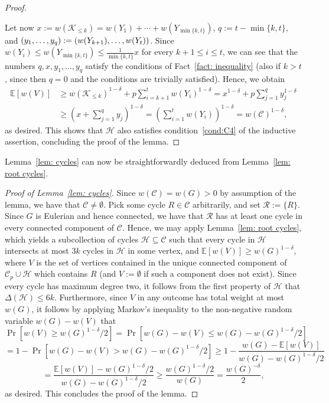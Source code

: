 \documentclass[11pt,reqno]{article}
\newenvironment{claimproof}[1][\proofname]{\proof[#1]\renewcommand{\qedsymbol}{$\blacksquare$}}{\endproof}
\begin{document}
\begin{proof}
\begin{claimproof}
\textcolor{white}{hack}
\end{claimproof}

Let now $x:=w(\mathcal{K}_{\le k})=w(Y_1)+\cdots+w(Y_{\min\{k,t\}})$, $q:=t-\min\{k,t\}$, and $(y_1,\ldots,y_{q}):=\linebreak(w(Y_{k+1}),\ldots,w(Y_t))$. Since $w(Y_i)\le w(Y_{\min\{k,t\}})\le \frac{1}{\min\{k,t\}}x$ for every $k+1\le i \le t$, we can see that the numbers $q,x,y_1,\ldots,y_q$ satisfy the conditions of Fact~\ref{fact: inequality} (also if $k>t$, since then $q=0$ and the conditions are trivially satisfied). Hence, we obtain
 \begin{align*}
        \mathbb{E}[w(V)]&\ge w(\mathcal K_{\leq k})^{1-\delta}+p\sum_{i=k+1}^t w(Y_i)^{1-\delta}=x^{1-\delta}+p\sum_{j=1}^q y_j^{1-\delta}\\
        &\ge \left(x+\sum_{j=1}^q y_j\right)^{1-\delta}=\left(\sum_{i=1}^tw(Y_i)\right)^{1-\delta}=w(\mathcal{C})^{1-\delta},
    \end{align*}
    as desired. This shows that $\mathcal{H}$ also satisfies condition~\ref{cond:C4} of the inductive assertion, concluding the proof of the lemma.
\end{proof}

Lemma~\ref{lem: cycles} can now be straightforwardly deduced from Lemma~\ref{lem: root cycles}.

\begin{proof}[Proof of Lemma~\ref{lem: cycles}]
    Since $w(\mathcal{C})=w(G)>0$ by assumption of the lemma, we have that $\mathcal{C}\neq \emptyset$.
    Pick some cycle $R\in\mathcal C$ arbitrarily, and set $\mathcal{R}:=\{R\}$. Since $G$ is Eulerian and hence connected, we have that $\mathcal{R}$ has at least one cycle in every connected component of $\mathcal{C}$. Hence, we may apply Lemma~\ref{lem: root cycles}, which yields a subcollection of cycles $\mathcal{H}\subseteq \mathcal C$ such that every cycle in $\mathcal{H}$ intersects at most $3k$ cycles in $\mathcal{H}$ in some vertex, and $\mathbb E[w(V)]\geq w(G)^{1-\delta}$, where $V$ is the set of vertices contained in the unique connected component of $\mathcal C_p\cup \mathcal H$ which contains $R$ (and $V:=\emptyset$ if such a component does not exist). Since every cycle has maximum degree two, it follows from the first property of $\mathcal{H}$ that $\Delta(\mathcal H)\leq 6k$. Furthermore, since $V$ in any outcome has total weight at most $w(G)$, it follows by applying Markov's inequality to the non-negative random variable $w(G)-w(V)$ that $$\Pr[w(V)\ge w(G)^{1-\delta}/2]=\Pr\left[w(G)-w(V)\le w(G)-w(G)^{1-\delta}/2\right]$$
    $$=1-\Pr\left[w(G)-w(V)> w(G)-w(G)^{1-\delta}/2\right]\ge 1-\frac{w(G)-\mathbb{E}[w(V)]}{w(G)-w(G)^{1-\delta}/2}$$
    $$=\frac{\mathbb{E}[w(V)]-w(G)^{1-\delta}/2}{w(G)-w(G)^{1-\delta}/2}\ge \frac{w(G)^{1-\delta}/2}{w(G)}=\frac{w(G)^{-\delta}}{2},$$ as desired. This concludes the proof of the lemma.
\end{proof}
\end{document}
